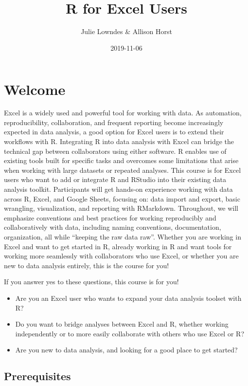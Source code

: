 \documentclass[]{book}
\title{R for Excel Users}
\author{Julie Lowndes \& Allison Horst}
\date{2019-11-06}
\providecommand{\tightlist}{%
  \setlength{\itemsep}{0pt}\setlength{\parskip}{0pt}}
\begin{document}
\maketitle

{
\setcounter{tocdepth}{1}
\tableofcontents
}
\hypertarget{welcome}{%
\chapter{Welcome}\label{welcome}}

Excel is a widely used and powerful tool for working with data. As automation, reproducibility, collaboration, and frequent reporting become increasingly expected in data analysis, a good option for Excel users is to extend their workflows with R. Integrating R into data analysis with Excel can bridge the technical gap between collaborators using either software. R enables use of existing tools built for specific tasks and overcomes some limitations that arise when working with large datasets or repeated analyses. This course is for Excel users who want to add or integrate R and RStudio into their existing data analysis toolkit. Participants will get hands-on experience working with data across R, Excel, and Google Sheets, focusing on: data import and export, basic wrangling, visualization, and reporting with RMarkdown. Throughout, we will emphasize conventions and best practices for working reproducibly and collaboratively with data, including naming conventions, documentation, organization, all while ``keeping the raw data raw''. Whether you are working in Excel and want to get started in R, already working in R and want tools for working more seamlessly with collaborators who use Excel, or whether you are new to data analysis entirely, this is the course for you!

If you answer yes to these questions, this course is for you!

\begin{itemize}
\tightlist
\item
  Are you an Excel user who wants to expand your data analysis toolset with R?
\item
  Do you want to bridge analyses between Excel and R, whether working independently or to more easily collaborate with others who use Excel or R?
\item
  Are you new to data analysis, and looking for a good place to get started?
\end{itemize}

\hypertarget{prerequisites}{%
\section{Prerequisites}\label{prerequisites}}
\end{document}
